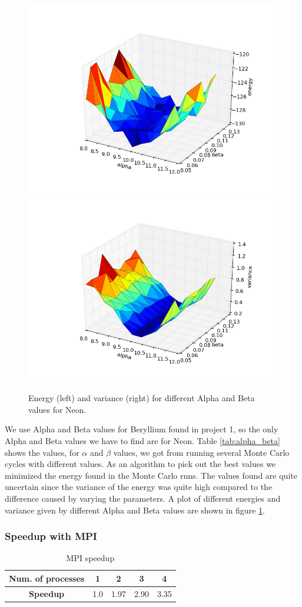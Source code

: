 \documentclass[11pt]{article}
\begin{document}
		\begin{figure}
			\centering \includegraphics[width=0.45\linewidth]{../figures/Neon_alpha_beta}
			\centering \includegraphics[width=0.45\linewidth]{../figures/Neon_alpha_beta_var}
			\protect\caption{Energy (left) and variance (right) for different Alpha and Beta values for Neon.}
			\label{fig:alpha_beta_comparison}
		\end{figure}

		We use Alpha and Beta values for Beryllium found in project 1, so the only Alpha and Beta values we have to find are for Neon. Table \ref{tab:alpha_beta} shows the values, for \(\alpha\) and \(\beta\) values, we got from  running several Monte Carlo cycles with different values. As an algorithm to pick out the best values we minimized the energy found in the Monte Carlo runs. The values found are quite uncertain since the variance of the energy was quite high compared to the difference caused by varying the parameters. A plot of different energies and variance given by different Alpha and Beta values are shown in figure \ref{fig:alpha_beta_comparison}.

	\subsubsection{Speedup with MPI}
		\begin{table}
		\center
				\begin{tabular}{| c | c| c| c| c|}
				    \hline
				   	\textbf{Num. of processes} &	1	&	2	&	3	&	4
				    \\ \hline
				    \textbf{Speedup}	&	1.0	&	1.97	&	2.90	&	3.35
				    \\	\hline
			  \end{tabular}
			  \caption{MPI speedup}
			  \label{tab:MPI_speedup}
		\end{table}
\end{document}
